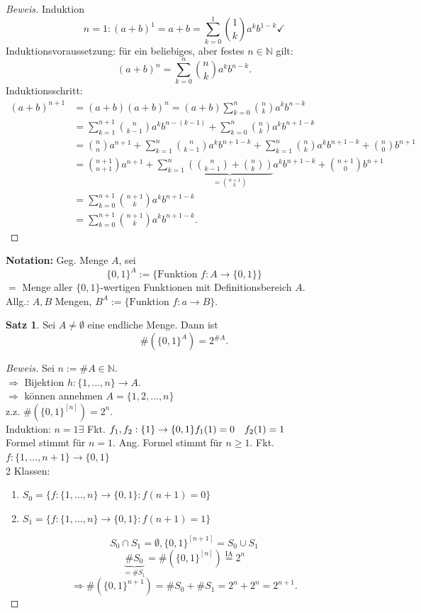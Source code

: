 \documentclass[12pt,a4paper,titlepage]{article} %
\theoremstyle{definition}
\newtheorem{satz}{Satz}[subsection]
\theoremstyle{remark}
\newenvironment{bew}{\begin{proof}[Beweis]}{\end{proof}}
\newcommand{\N}{\mathbb{N}}
\begin{document}
\begin{bew} Induktion
	\[n=1: (a+b)^1 = a+b = \sum_{k=0}^{1}\binom{1}{k} a^kb^{1-k} \checkmark \]
	Induktionsvoraussetzung: für ein beliebiges, aber festes \(n \in\N\) gilt: 
	\[(a+b)^n = \sum_{k=0}^{n} \binom{n}{k} a^kb^{n-k}. \]
	Induktionsschritt: 
	\begin{align*}
		(a+b)^{n+1} &= (a+b) (a+b)^n = (a+b) \sum_{k=0}^{n} \binom{n}{k} a^kb^{n-k}\\
		&= \sum_{k=1}^{n+1} \binom{n}{k-1} a^kb^{n-(k-1)} + \sum_{k=0}^{n} \binom{n}{k} a^kb^{n+1-k}\\
		&= \binom{n}{n} a^{n+1} + \sum_{k=1}^{n} \binom{n}{k-1} a^kb^{n+1-k} + \sum_{k=1}^{n} \binom{n}{k} a^kb^{n+1-k} + \binom{n}{0} b^{n+1}\\
		&= \binom{n+1}{n+1} a^{n+1} + \sum_{k=1}^{n} \underbrace{\left(\binom{n}{k-1} + \binom{n}{k}\right)}_{=\binom{n+1}{k}} a^kb^{n+1-k} + \binom{n+1}{0} b^{n+1}\\
		&= \sum_{k=0}^{n+1} \binom{n+1}{k} a^kb^{n+1-k}\\
		&= \sum_{k=0}^{n+1} \binom{n+1}{k} a^kb^{n+1-k}.
	\end{align*}
\end{bew}
\textbf{Notation:} Geg. Menge \(A\), sei \[ \{0,1\}^A := \{ \text{Funktion }f:A\rightarrow \{0,1\} \} \] \(= \) Menge aller \(\{0,1\}\)-wertigen Funktionen mit Definitionsbereich \(A\).\\
Allg.: \(A,B\) Mengen, \(B^A := \{ \text{Funktion } f: a\rightarrow B\}\).
\begin{satz}
	Sei \(A\neq\emptyset\) eine endliche Menge. Dann ist \[\#(\{0,1\}^A) = 2^{\#A}.\]
\end{satz}
\begin{bew}
	Sei \(n := \# A \in\N \).\\
	\(\Rightarrow\) Bijektion \(h:\{1,\ldots,n\} \rightarrow A\).\\
	\( \Rightarrow \) können annehmen \(A = \{1,2,\ldots,n\}\)\\
	z.z. \(\#( \{0,1\}^[n] ) = 2^n\).\\
	Induktion: \(n=1 \exists \) Fkt. \(f_1,f_2 : \{1\} \rightarrow \{0,1\} \\
	f_1(1) = 0 \quad f_2(1) = 1 \)\\
	Formel stimmt für \(n=1\).
	Ang. Formel stimmt für \(n\geq 1\). Fkt. \(f: \{1,\ldots, n+1\} \rightarrow \{0,1\} \)\\
	2 Klassen: 
	\begin{enumerate}
		\item \(S_0 = \{f: \{1,\ldots,n\} \rightarrow \{0,1\}: f(n+1) = 0 \}\)
		\item \(S_1 = \{f: \{1,\ldots,n\} \rightarrow \{0,1\}: f(n+1) = 1 \}\)
	\end{enumerate}
	\[S_0 \cap S_1 = \emptyset, \{0,1\}^{[n+1]} = S_0 \cup S_1 \]
	\[\underbrace{\# S_0}_{=\#S_1} = \# (\{0,1\}^{[n]})  \overset{\text{IA}}{=} 2^n \]
	\[ \Rightarrow \# (\{0,1\}^{n+1}) = \#S_0+\#S_1 = 2^n + 2^n = 2^{n+1}. \]
\end{bew}
\end{document}
